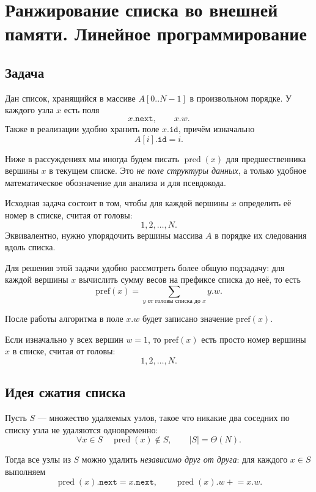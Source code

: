 
	\section{Ранжирование списка во внешней памяти. Линейное программирование}
	
	\subsection{Задача}
	Дан список, хранящийся в массиве $A[0..N-1]$ в произвольном порядке.
	У каждого узла $x$ есть поля
	\[
	x.\texttt{next},
	\qquad
	x.w.
	\]
	Также в реализации удобно хранить поле $x.\texttt{id}$, причём изначально
	\[
	A[i].\texttt{id}=i.
	\]
	
	\medskip
	\noindent
	\begin{Remark}{}{}
		Ниже в рассуждениях мы иногда будем писать $\operatorname{pred}(x)$ для предшественника вершины $x$ в текущем списке.
		Это \emph{не поле структуры данных}, а только удобное математическое обозначение для анализа и для псевдокода.
	\end{Remark}
	
	Исходная задача состоит в том, чтобы для каждой вершины $x$ определить её номер в списке, считая от головы:
	\[
	1,2,\dots,N.
	\]
	Эквивалентно, нужно упорядочить вершины массива $A$ в порядке их следования вдоль списка.
	
	Для решения этой задачи удобно рассмотреть более общую подзадачу:
	для каждой вершины $x$ вычислить сумму весов на префиксе списка до неё, то есть
	\[
	\mathrm{pref}(x)=\sum_{y \text{ от головы списка до } x} y.w.
	\]
	
	После работы алгоритма в поле $x.w$ будет записано значение $\mathrm{pref}(x)$.
	
	Если изначально у всех вершин $w=1$, то $\mathrm{pref}(x)$ есть просто номер вершины $x$ в списке, считая от головы:
	\[
	1,2,\dots,N.
	\]
	
	\subsection{Идея сжатия списка}
	
	Пусть $S$ --- множество удаляемых узлов, такое что никакие два соседних по списку узла не удаляются одновременно:
	\[
	\forall x\in S\quad \operatorname{pred}(x)\notin S,
	\qquad |S|=\Theta(N).
	\]
	
	Тогда все узлы из $S$ можно удалить \emph{независимо друг от друга}:
	для каждого $x\in S$ выполняем
	\[
	\operatorname{pred}(x).\texttt{next}=x.\texttt{next},
	\qquad
	\operatorname{pred}(x).w \mathrel{+}= x.w.
	\]
	
